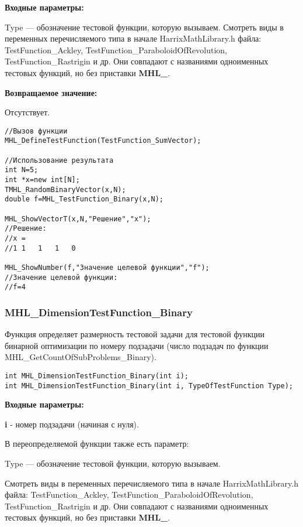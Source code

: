 \documentclass[a4paper,12pt]{article}
\begin{document}
\textbf{Входные параметры:}
  
Type --- обозначение тестовой функции, которую вызываем.
Смотреть виды в переменных перечисляемого типа в начале HarrixMathLibrary.h файла: TestFunction\_Ackley, TestFunction\_ParaboloidOfRevolution, TestFunction\_Rastrigin и др. Они совпадают с названиями одноименных тестовых функций, но без приставки \textbf{MHL\_}.

\textbf{Возвращаемое значение:}
 
Отсутствует.


\begin{lstlisting}[label=code_use_MHL_DefineTestFunction,caption=Пример использования]
//Вызов функции
MHL_DefineTestFunction(TestFunction_SumVector);

//Использование результата
int N=5;
int *x=new int[N];
TMHL_RandomBinaryVector(x,N);
double f=MHL_TestFunction_Binary(x,N);

MHL_ShowVectorT(x,N,"Решение","x");
//Решение:
//x =	
//1	1	1	1	0

MHL_ShowNumber(f,"Значение целевой функции","f");
//Значение целевой функции:
//f=4
\end{lstlisting}

\subsubsection{MHL\_DimensionTestFunction\_Binary}\label{MHL_DimensionTestFunction_Binary}

Функция определяет размерность тестовой задачи для тестовой функции бинарной оптимизации по номеру подзадачи (число подзадач по функции MHL\_GetCountOfSubProblems\_Binary).


\begin{lstlisting}[label=code_syntax_MHL_DimensionTestFunction_Binary,caption=Синтаксис]
int MHL_DimensionTestFunction_Binary(int i);
int MHL_DimensionTestFunction_Binary(int i, TypeOfTestFunction Type);
\end{lstlisting}

\textbf{Входные параметры:}

\textbf{i} - номер подзадачи (начиная с нуля).

В переопределяемой функции также есть параметр:
  
Type --- обозначение тестовой функции, которую вызываем. 

Смотреть виды в переменных перечисляемого типа в начале HarrixMathLibrary.h файла: TestFunction\_Ackley, TestFunction\_ParaboloidOfRevolution, TestFunction\_Rastrigin и др. Они совпадают с названиями одноименных тестовых функций, но без приставки \textbf{MHL\_}.
\end{document}
